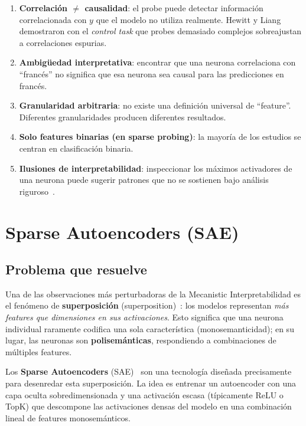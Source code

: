 \documentclass[11pt,a4paper]{report}
\theoremstyle{definition}
\begin{document}
\begin{enumerate}
    \item \textbf{Correlación $\neq$ causalidad}: el probe puede detectar información correlacionada con $y$ que el modelo no utiliza realmente. Hewitt y Liang~\cite{hewitt2019selectivity} demostraron con el \emph{control task} que probes demasiado complejos sobreajustan a correlaciones espurias.
    \item \textbf{Ambigüedad interpretativa}: encontrar que una neurona correlaciona con ``francés'' no significa que esa neurona sea causal para las predicciones en francés.
    \item \textbf{Granularidad arbitraria}: no existe una definición universal de ``feature''. Diferentes granularidades producen diferentes resultados.
    \item \textbf{Solo features binarias (en sparse probing)}: la mayoría de los estudios se centran en clasificación binaria.
    \item \textbf{Ilusiones de interpretabilidad}: inspeccionar los máximos activadores de una neurona puede sugerir patrones que no se sostienen bajo análisis riguroso~\cite{bolukbasi2021interpretability}.
\end{enumerate}

\newpage

\chapter{Sparse Autoencoders (SAE)}
\label{ch:sae}

\section{Problema que resuelve}

Una de las observaciones más perturbadoras de la Mecanistic Interpretabilidad es el fenómeno de \textbf{superposición} (superposition)~\cite{elhage2022superposition}: los modelos representan \emph{más features que dimensiones en sus activaciones}. Esto significa que una neurona individual raramente codifica una sola característica (monosemanticidad); en su lugar, las neuronas son \textbf{polisemánticas}, respondiendo a combinaciones de múltiples features.

Los \textbf{Sparse Autoencoders} (SAE)~\cite{bricken2023monosemanticity,cunningham2023sae} son una tecnología diseñada precisamente para desenredar esta superposición. La idea es entrenar un autoencoder con una capa oculta sobredimensionada y una activación escasa (típicamente ReLU o TopK) que descompone las activaciones densas del modelo en una combinación lineal de features monosemánticos.
\end{document}
